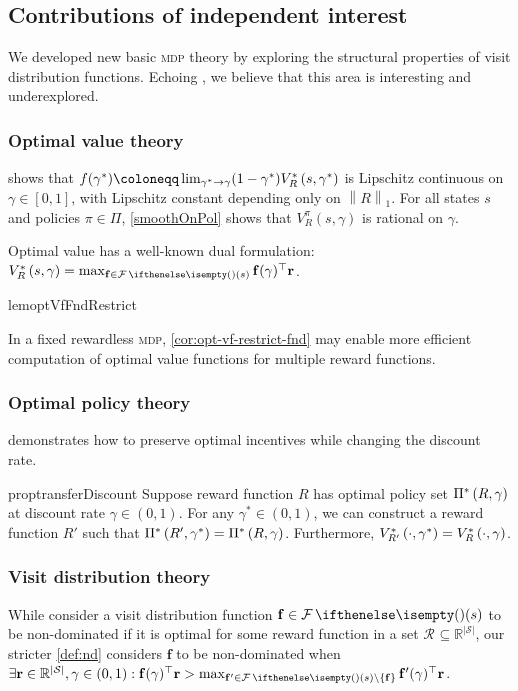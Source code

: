 \documentclass{article}
\renewcommand{\abs}[1]{\left|#1\right|}
\renewcommand{\set}[1]{\left\{#1\right\}}
\newcommand*{\defeq}{\coloneqq} %
\newcommand*{\reals}{\mathbb{R}}
\newcommand*{\mdp}[1][m]{{\textsc{#1dp}}}
\newcommand*{\St}{\mathcal{S}}
\newcommand*{\rf}{\mathbf{r}} %
\newcommand*{\rewardVS}{\reals^{\abs{\St}}} %
\newcommand*{\optPi}{\piSet[*]}
\newcommand*{\f}{\mathbf{f}} %
\newcommand*{\lone}[1]{\left \lVert#1\right \rVert_1}
\theoremstyle{definition}
\newcommand*{\R}[1][]{\mathcal{R}_\text{#1}} %
\begin{document}
\begin{appendices}
\subsection{Contributions of independent interest}\label{app:contrib}
We developed new basic {\mdp} theory by exploring the structural properties of visit distribution functions. Echoing \citet{wang_dual_2007,wang_stable_2008}, we believe that this area is interesting and underexplored.

\subsubsection{Optimal value theory} 
 shows that $f(\gamma^*)\defeq\lim_{\gamma^*\to \gamma}(1-\gamma^*)\OptVf{s,\gamma^*}$ is Lipschitz continuous on $\gamma\in[0,1]$, with Lipschitz constant depending only on $\lone{R}$.  For all states $s$ and policies $\pi\in\Pi$, \cref{smoothOnPol} shows that $V^\pi_R(s,\gamma)$ is rational on $\gamma$. 

Optimal value has a well-known dual formulation: $\OptVf{s,\gamma}=\max_{\f\in\F(s)}\f(\gamma)^\top \rf$. 
\begin{restatable*}[$\forall\gamma\in[0,1):\OptVf{s,\gamma}=\max_{\f\in\Fnd(s)}\f(\gamma)^\top \rf$]{lem}{optVfFndRestrict}\label{cor:opt-vf-restrict-fnd}
\end{restatable*}
In a fixed rewardless {\mdp}, \cref{cor:opt-vf-restrict-fnd} may enable more efficient computation of optimal value functions for multiple reward functions.

\subsubsection{Optimal policy theory} 
 demonstrates how to preserve optimal incentives while changing the discount rate.

\begin{restatable*}{prop}{transferDiscount}\label{transferDiscount}
Suppose reward function $R$ has optimal policy set $\optPi[R,\gamma]$ at discount rate $\gamma\in(0,1)$. For any $\gamma^*\in(0,1)$, we can construct a reward function $R'$ such that $\optPi[R',\gamma^*]=\optPi$. Furthermore, $\OptVf[R']{\cdot,\gamma^*}=\OptVf[R]{\cdot, \gamma}$.
\end{restatable*} 

\subsubsection{Visit distribution theory} 
While \citet{regan_robust_2010} consider  a visit distribution function $\f\in\F(s)$ to be non-dominated if it is optimal for some reward function in a set $\R\subseteq \rewardVS$, our stricter \cref{def:nd} considers $\f$ to be non-dominated when $\exists\rf\in\rewardVS, \gamma\in(0,1):\f(\gamma)^\top \rf > \max_{\f'\in\F(s)\setminus\set{\f}}\f'(\gamma)^\top\rf$.



\end{appendices}
\end{document}
